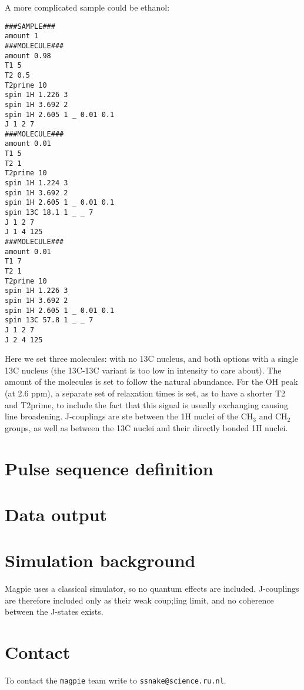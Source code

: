 \documentclass[11pt,a4paper]{article}
\begin{document}
A more complicated sample could be ethanol:
\begin{verbatim}
###SAMPLE###
amount 1
###MOLECULE###
amount 0.98 
T1 5
T2 0.5
T2prime 10
spin 1H 1.226 3
spin 1H 3.692 2
spin 1H 2.605 1 _ 0.01 0.1
J 1 2 7
###MOLECULE###
amount 0.01 
T1 5
T2 1
T2prime 10
spin 1H 1.224 3
spin 1H 3.692 2
spin 1H 2.605 1 _ 0.01 0.1
spin 13C 18.1 1 _ _ 7
J 1 2 7
J 1 4 125
###MOLECULE###
amount 0.01 
T1 7
T2 1
T2prime 10
spin 1H 1.226 3
spin 1H 3.692 2
spin 1H 2.605 1 _ 0.01 0.1
spin 13C 57.8 1 _ _ 7
J 1 2 7
J 2 4 125
\end{verbatim}
Here we set three molecules: with no 13C nucleus, and both options with a single 13C nucleus (the 13C-13C variant is too low in intensity to care about). The amount of the molecules is set to follow the natural abundance. For the OH peak (at 2.6 ppm), a separate set of relaxation times is set, as to have a shorter T2 and T2prime, to include the fact that this signal is usually exchanging causing line broadening. J-couplings are ste between the 1H nuclei of the CH$_3$ and CH$_2$ groups, as well as between the 13C nuclei and their directly bonded 1H nuclei. 

\section{Pulse sequence definition}

\section{Data output}

\section{Simulation background}
Magpie uses a classical simulator, so no quantum effects are included. J-couplings are therefore included only as their weak coup;ling limit, and no coherence between the J-states exists.



\section{Contact}
To contact the \texttt{magpie} team write to \texttt{ssnake@science.ru.nl}.



\end{document}
